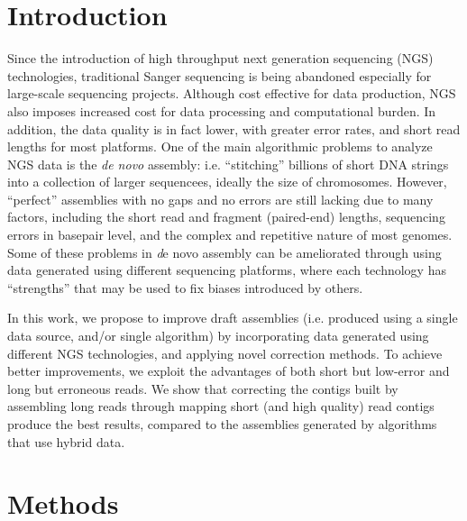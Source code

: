 \documentclass[12pt]{article}
\begin{document}
\onehalfspacing
\vspace*{-0.3cm}
\section{Introduction}
Since the introduction of high throughput next generation sequencing (NGS) technologies, traditional Sanger sequencing is being abandoned especially for large-scale sequencing projects.
Although cost effective for data production, NGS also imposes increased cost for data processing and computational burden. In addition, the data quality is in fact lower, with greater error rates, and short
read lengths for most platforms. One of the main algorithmic problems to analyze NGS data is the \textit{de novo} assembly: i.e. ``stitching'' billions of short DNA strings into a collection of larger sequencees, ideally the size of chromosomes. However, ``perfect'' assemblies with no gaps and no errors are still lacking due to many factors,  including the short read and fragment (paired-end) lengths, sequencing errors in basepair level, and the complex and repetitive nature of most genomes. Some of these problems in {\textit de novo} assembly can be ameliorated through using data generated using different sequencing platforms, where each technology has ``strengths'' that may be used to fix biases introduced by others.


In this work, we propose to  improve draft assemblies (i.e. produced using a single data source, and/or single algorithm) by incorporating data generated using different NGS technologies, and applying novel correction methods. To achieve better improvements, we exploit the advantages of both short but low-error 
and long but erroneous reads. 
We show that correcting the contigs built by assembling long reads through mapping short (and high quality) read contigs produce the best results, compared to the assemblies generated by algorithms that use hybrid data.
\vspace*{-0.3cm}
\section{Methods}
\label{meth}
\end{document}
